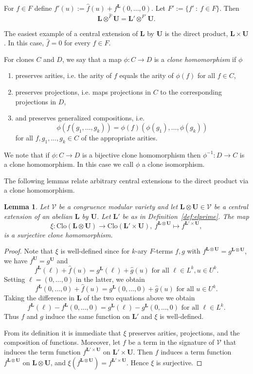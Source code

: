 \documentclass[10pt,a4paper]{amsart}
\numberwithin{equation}{section}
\newtheorem{lemma}[theorem]{Lemma}
\newcommand{\st}{\ :\ }
\renewcommand{\L}{\mathbf{L}}
\newcommand{\U}{\mathbf{U}}
\newcommand{\V}{\mathcal{V}}
\newcommand{\Clo}{\mathrm{Clo}}
\begin{document}
For $f\in F$ define $f'(u) := \hat{f}(u)+f^\L(0,\dots,0)$. 
Let $F' := \{f'\st f\in F\}$. 
Then
  \[ \L\otimes^{\hat{F}}\U = \L'\otimes^{F'}\U. \] 
 
The easiest example of a central extension of $\L$ by $\U$ is the direct product, $\L \times \U$. 
In this case, $\hat{f} = 0$ for every $f \in F$. 
 
For clones $C$ and $D$, we say that a map $\phi \colon C \rightarrow D$ is a \emph{clone homomorphism} if $\phi$
  \begin{enumerate}
    \item preserves arities, i.e. the arity of $f$ equals the arity of $\phi(f)$ for all $f \in C$,
    \item preserves projections, i.e. maps projections in $C$ to the corresponding projections in $D$,
    \item and preserves generalized compositions, i.e. \[\phi(f(g_1,\ldots,g_k)) = \phi(f)(\phi(g_1), \ldots, \phi(g_k)) \] 
      for all $f, g_1, \ldots, g_k \in C$ of the appropriate arities. 
  \end{enumerate}
We note that if $\phi \colon C \rightarrow D$ is a bijective clone homomorphism then $\phi^{-1} \colon D \rightarrow C$ 
  is a clone homomorphism.
In this case we call $\phi$ a clone isomorphism.
 
The following lemmas relate arbitrary central extensions to the direct product via a clone homomorphism. 
 
\begin{lemma} \label{lem:clonehom}
  Let $\V$ be a congruence modular variety and let $\L \otimes \U \in \V$ be a central extension 
    of an abelian $\L$ by $\U$. Let $\L'$ be as in Definition~\ref{def:elprime}. 
  The map
    \[ \xi\colon\Clo(\L\otimes\U) \to \Clo(\L'\times\U),\ f^{\L\otimes \U} \mapsto f^{\L'\times\U}, \]
    is a surjective clone homomorphism. 
\end{lemma}

\begin{proof}  
  Note that $\xi$ is well-defined since for $k$-ary $F$-terms $f,g$ with 
    $f^{\L\otimes \U} = g^{\L\otimes \U}$, we have $f^\U=g^\U$ and
    \[ f^\L(\ell)+\hat{f}(u) = g^\L(\ell)+\hat{g}(u) \text{ for all } \ell\in L^k, u\in U^k. \]
  Setting $\ell = (0,\dots,0)$ in the latter, we obtain
    \[ f^\L(0,\dots,0)+\hat{f}(u) = g^\L(0,\dots,0) +\hat{g}(u) \text{ for all } u\in U^k. \]
  Taking the difference in $\L$ of the two equations above we obtain
    \[ f^\L(\ell) - f^\L(0,\dots,0) = g^\L(\ell)-g^\L(0,\dots,0) \text{ for all } \ell\in L^k. \]
  Thus $f$ and $g$ induce the same function on $\L'$ and $\xi$ is well-defined.
 
  From its definition it is immediate that $\xi$ preserves arities, projections, and the composition of functions.  
  Moreover, let $f$ be a term in the signature of $\V$ that induces the term function 
    $f^{\L' \times \U}$ on $\L' \times \U$. 
  Then $f$ induces a term function $f^{\L \otimes \U}$ on $\L \otimes \U$, and 
    $\xi(f^{\L \otimes \U}) = f^{\L' \times \U}$.
  Hence $\xi$ is surjective.
\end{proof}
\end{document}
